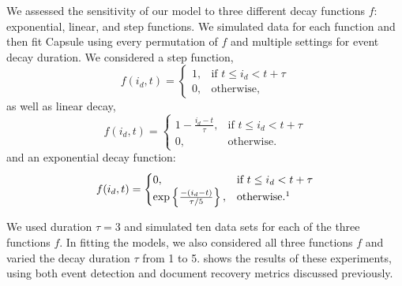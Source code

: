   We assessed the sensitivity of our model to three different decay functions $f$: exponential, linear, and step functions.  We simulated data for each function and then fit Capsule using every permutation of $f$ and multiple settings for event decay duration. 
We considered a step function,
\begin{equation}
f(i_d, t) = 
\begin{cases}
    1,			& \text{if } t \le i_d < t+\tau  \\
    0,          & \text{otherwise,}
\end{cases}
\label{eq:fstep}
\end{equation}
as well as linear decay,
\begin{equation}
f(i_d, t) = 
\begin{cases}
    1 - \frac{i_d - t}{\tau},			& \text{if } t \le i_d < t+\tau  \\
    0,          & \text{otherwise.}
\end{cases}
\label{eq:flinear}
\end{equation}
and an exponential decay function:
\begin{equation}
f(i_d, t) = 
\begin{cases}
    0,			& \text{if } t \le i_d < t + \tau\\
    \exp\left\{\frac{-(i_d - t)}{\tau/5}\right\},          & \text{otherwise.}\footnotemark
\end{cases}
\label{eq:fexp}
\end{equation}


We used duration $\tau=3$ and simulated ten data sets for each of the three functions $f$.  In fitting the models, we also considered all three functions $f$ and varied the decay duration $\tau$ from 1 to 5.   shows the results of these experiments, using both event detection and document recovery metrics discussed previously.

